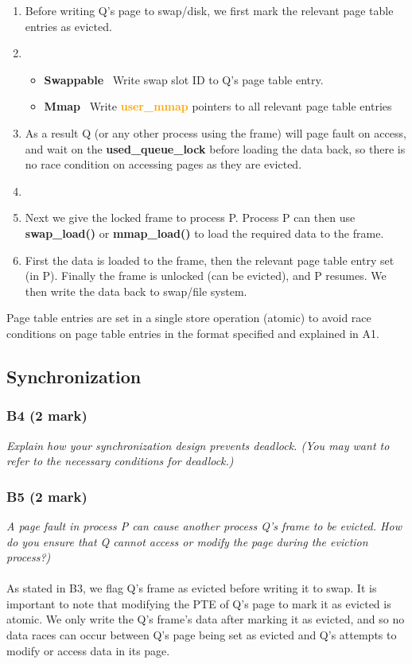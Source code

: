 \documentclass{report}
\newcommand{\question}[1]{\textit{#1} \ }
\newcommand{\bullpara}[2]{\item \textbf{#1} \ #2}
\newcommand{\fun}[1]{\textcolor{Emerald}{\textbf{#1}}}
\newcommand{\struct}[1]{\textcolor{orange}{\textbf{#1}}}
\newcommand{\var}[1]{\textcolor{RoyalPurple}{\textbf{#1}}}
\newcommand{\compitem}[1]{\begin{itemize}\setlength\itemsep{-0.5em}#1\end{itemize}}
\newcommand{\compenum}[1]{\begin{enumerate}\setlength\itemsep{-0.5em}#1\end{enumerate}}
\begin{document}
				\compenum {
					\item Before writing Q's page to swap/disk, we first mark the relevant 
					      page table entries as evicted.
					\item \compitem{
					          \bullpara{Swappable}{Write swap slot ID to Q's page table entry.}
					          \bullpara{Mmap}{Write \struct{user\_mmap} pointers to all relevant page table entries}
				        }
					\item As a result Q (or any other process using the frame) will page 
					      fault on access, and wait on the \var{used\_queue\_lock} before 
								loading the data back, so there is no race condition on accessing pages as they are evicted.
					\item
					\item Next we give the locked frame to process P. Process P can then use 
					      \fun{swap\_load()} or \fun{mmap\_load()} to load the required data 
								to the frame. 
					\item First the data is loaded to the frame, then the relevant page table 
					      entry set (in P). Finally the frame is unlocked (can be evicted), 
								and P resumes. We then write the data back to swap/file system.
				}
				Page table entries are set in a single store operation (atomic) to avoid
				race conditions on page table entries in the format specified and explained in A1.

		\subsection*{Synchronization}
			\subsubsection*{B4 (2 mark)}
				\question{Explain how your synchronization design prevents deadlock.
				(You may want to refer to the necessary conditions for deadlock.)}

				
				

			\subsubsection*{B5 (2 mark)}
				\question{A page fault in process P can cause another process Q's frame to
				be evicted. How do you ensure that Q cannot access or modify the page 
				during the eviction process?)}
				\\
				\\As stated in B3, we flag Q's frame as evicted before writing it to swap.
				It is important to note that modifying the PTE of Q's page to mark it as evicted
				is atomic. We only write the Q's frame's data after marking it as evicted,
				and so no data races can occur between Q's page being set as evicted and
				Q's attempts to modify or access data in its page.
				
\end{document}
